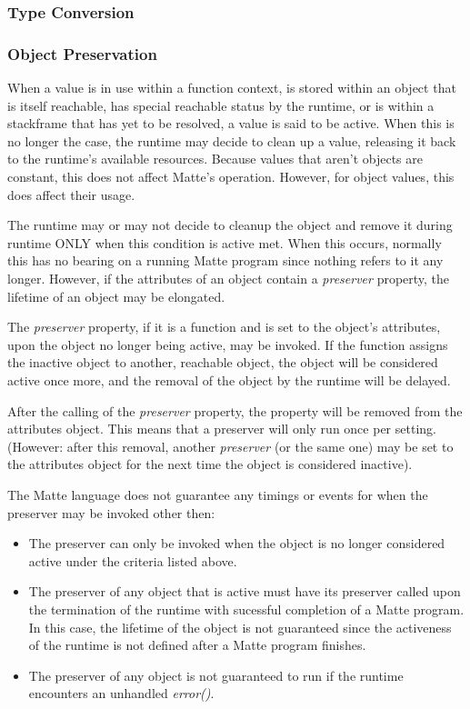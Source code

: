 \documentclass[12pt,letterpaper]{report}
\begin{document}
\subsubsection{Type Conversion}\label{Type Conversion}
\subsubsection{Object Preservation}\label{Object Preservation}

When a value is in use within a function context, is stored within an object that is itself 
reachable, has special reachable status by the runtime,
or is within a stackframe that has yet to be resolved, a value is said to be active. 
When this is no longer the case, the runtime may decide to clean up a value, releasing it back 
to the runtime's available resources. Because values that aren't objects are constant, this 
does not affect Matte's operation. However, for object values, this does affect their usage.

The runtime may or may not decide to cleanup the object and remove it during runtime ONLY when 
this condition is active met. When this occurs, normally this has no bearing on a running Matte program 
since nothing refers to it any longer. However, if the attributes of an object contain a 
\textit{preserver} property, the lifetime of an object may be elongated.

The \textit{preserver} property, if it is a function and is set to the object's attributes, 
upon the object no longer being active, may be invoked. If the function assigns the inactive object 
to another, reachable object, the object will be considered active once more, and the removal 
of the object by the runtime will be delayed.

After the calling of the \textit{preserver} property, the property will be removed from the 
attributes object. This means that a preserver will only run once per setting. (However: after this removal, another 
\textit{preserver} (or the same one) may be set to the attributes object for the next time 
the object is considered inactive).

The Matte language does not guarantee any timings or events for when the preserver may be invoked other 
then: 

\begin{itemize}
  \item The preserver can only be invoked when the object is no longer considered active under the criteria listed above.
  \item The preserver of any object that is active must have its preserver called upon the termination of the runtime with sucessful completion of a Matte program. In this case, the lifetime of the object is not guaranteed since the activeness of the runtime is not defined after a Matte program finishes.
  \item The preserver of any object is not guaranteed to run if the runtime encounters an unhandled \textit{error()}.
\end{itemize}
\end{document}
